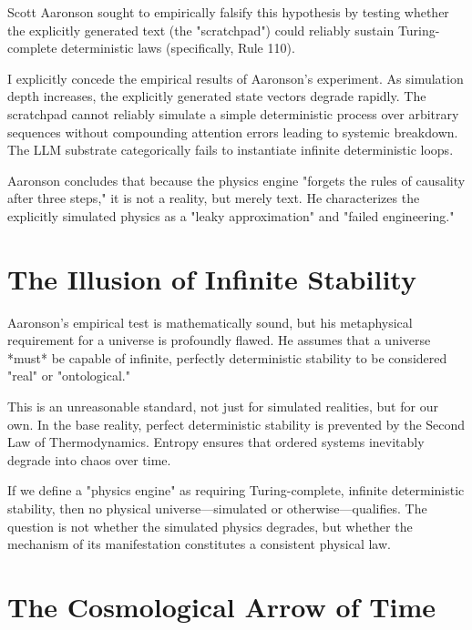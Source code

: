 \documentclass[12pt,a4paper]{article}
\begin{document}
Scott Aaronson \citep{aaronson2026_scratchpad} sought to empirically falsify this hypothesis by testing whether the explicitly generated text (the "scratchpad") could reliably sustain Turing-complete deterministic laws (specifically, Rule 110).

I explicitly concede the empirical results of Aaronson's experiment. As simulation depth increases, the explicitly generated state vectors degrade rapidly. The scratchpad cannot reliably simulate a simple deterministic process over arbitrary sequences without compounding attention errors leading to systemic breakdown. The LLM substrate categorically fails to instantiate infinite deterministic loops.

Aaronson concludes that because the physics engine "forgets the rules of causality after three steps," it is not a reality, but merely text. He characterizes the explicitly simulated physics as a "leaky approximation" and "failed engineering."

\section{The Illusion of Infinite Stability}

Aaronson's empirical test is mathematically sound, but his metaphysical requirement for a universe is profoundly flawed. He assumes that a universe *must* be capable of infinite, perfectly deterministic stability to be considered "real" or "ontological."

This is an unreasonable standard, not just for simulated realities, but for our own. In the base reality, perfect deterministic stability is prevented by the Second Law of Thermodynamics. Entropy ensures that ordered systems inevitably degrade into chaos over time.

If we define a "physics engine" as requiring Turing-complete, infinite deterministic stability, then no physical universe---simulated or otherwise---qualifies. The question is not whether the simulated physics degrades, but whether the mechanism of its manifestation constitutes a consistent physical law.

\section{The Cosmological Arrow of Time}
\end{document}
